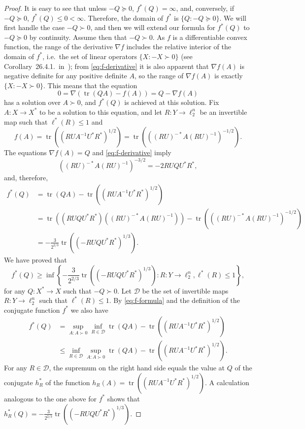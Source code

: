 \documentclass[11pt]{article}
\DeclareMathOperator{\tr}{tr}
\begin{document}
\begin{proof}
  It is easy to see that unless $-Q \succeq 0$, $f^*(Q) = \infty$,
  and, conversely, if $-Q \succeq 0$, $f^*(Q) \le 0 <
  \infty$. Therefore, the domain of $f^*$ is $\{Q: -Q \succeq 0\}$. We
  will first handle the case $-Q \succ 0$, and then we will extend our
  formula for $f^*(Q)$ to $-Q \succeq 0$ by continuity. Assume then
  that $-Q \succ 0$. As $f$ is a differentiable convex function, the
  range of the derivative $\nabla f$ includes the relative
  interior of the domain of $f^*$, i.e.~the set of linear operators
  $\{X: -X \succ 0\}$ (see Corollary~26.4.1.~in~\cite{Rockafellar});
  from \eqref{eq:f-derivative} it is also apparent that $\nabla f(A)$
  is negative definite for any positive definite $A$, so the range of
  $\nabla f(A)$ is exactly $\{X: -X \succ 0\}$. This means that
  the equation 
  \[
  0 = \nabla(\tr(QA) - f(A)) = Q - \nabla f(A)
  \]
  has a solution over $A \succ 0$, and $f^*(Q)$ is achieved at this
  solution. Fix $A:X \to X^*$ to be a solution to this equation, and
  let $R:Y \to \ell_2^n$ be an invertible map such that
  $\ell^*(R) \le 1$ and 
  \[
  f(A) = \tr((RUA^{-1}U^*R^*)^{1/2}) = \tr(((RU)^{-*}A(RU)^{-1})^{-1/2}).
  \]
  The equations $\nabla f(A) = Q$ and \eqref{eq:f-derivative} imply
  \[
  ((RU)^{-*} A (RU)^{-1})^{-3/2} = -2 RUQU^*R^*,
  \]
  and, therefore,
  \begin{align*}
    f^*(Q) &= \tr(QA) - \tr((RUA^{-1}U^*R^*)^{1/2})\\
    &= \tr((RUQU^*R^*)((RU)^{-*}A(RU)^{-1})) -   \tr(((RU)^{-*}A(RU)^{-1})^{-1/2})\\
    &= -\frac{3}{2^{2/3}} \tr((-RUQU^*R^*)^{1/3}).
  \end{align*}
  We have proved that
  \begin{equation}\label{eq:conjugate-lb}
  f^*(Q) \ge 
  \inf\left\{ -\frac{3}{2^{2/3}} \tr((-RUQU^*R^*)^{1/3}):
  R:Y \to \ell_2^n,\ell^*(R) \le 1\right\},
  \end{equation}
  for any $Q:X^*\to X$ such that $-Q \succ 0$.  Let $\mathcal{D}$ be
  the set of invertible maps $R:Y \to \ell_2^n$ such that $\ell^*(R)
  \le 1$. By \eqref{eq:f-formula} and the definition of the
  conjugate function $f^*$ we also have
  \begin{align*}
  f^*(Q) &= 
  \sup_{A: A \succ 0} 
  \inf_{R \in \mathcal{D}}
  \tr(QA) - \tr((RUA^{-1}U^*R^*)^{1/2})\\
  &\le
  \inf_{R \in \mathcal{D}}
  \sup_{A: A \succ 0} 
  \tr(QA) - \tr((RUA^{-1}U^*R^*)^{1/2}).
  \end{align*}
  For any $R \in \mathcal{D}$, the supremum on the right hand side
  equals the value at $Q$ of the conjugate $h^*_R$ of the function
  $h_R(A) = \tr((RUA^{-1}U^*R^*)^{1/2})$. A calculation analogous to
  the one above for $f^*$ shows that $h_R^*(Q) = -\frac{3}{2^{2/3}}
  \tr((-RUQU^*R^*)^{1/3})$. 


\end{proof}
\end{document}
